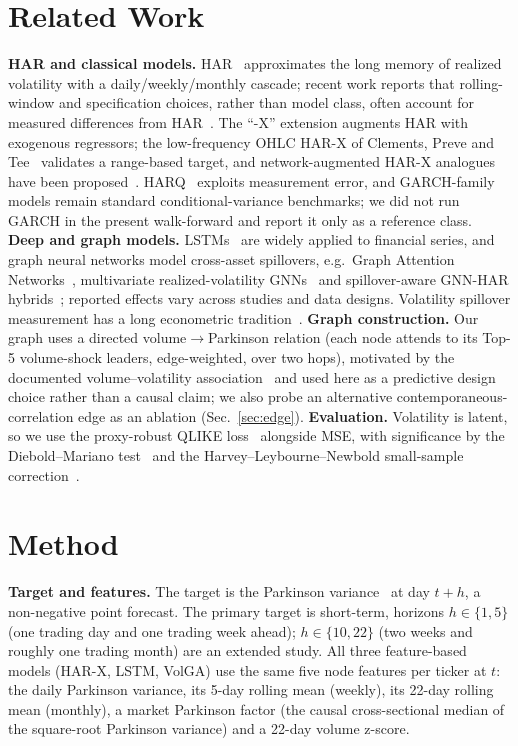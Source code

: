 \documentclass[runningheads]{llncs}
\begin{document}
\section{Related Work}
\textbf{HAR and classical models.} HAR~\cite{corsi2009} approximates the long memory of realized
volatility with a daily/weekly/monthly cascade; recent work reports that rolling-window and
specification choices, rather than model class, often account for measured differences from
HAR~\cite{audrino2025}. The ``-X'' extension augments HAR with exogenous regressors; the low-frequency
OHLC HAR-X of Clements, Preve and Tee~\cite{clements2024} validates a range-based target, and
network-augmented HAR-X analogues have been proposed~\cite{gnarharx2025}. HARQ~\cite{harq2016}
exploits measurement error, and GARCH-family models remain standard conditional-variance benchmarks;
we did not run GARCH in the present walk-forward and report it only as a reference class.
\textbf{Deep and graph models.} LSTMs~\cite{lstm1997} are widely applied to financial series, and
graph neural networks model cross-asset spillovers, e.g.\ Graph Attention Networks~\cite{gat2018},
multivariate realized-volatility GNNs~\cite{chen2022} and spillover-aware GNN-HAR
hybrids~\cite{gnnhar2025}; reported effects vary across studies and data designs. Volatility spillover
measurement has a long econometric tradition~\cite{dy2012}. \textbf{Graph construction.} Our graph
uses a directed volume$\to$Parkinson relation (each node attends to its Top-5 volume-shock leaders,
edge-weighted, over two hops), motivated by the documented volume--volatility
association~\cite{karpoff1987} and used here as a predictive design choice rather than a causal claim;
we also probe an alternative
contemporaneous-correlation edge as an ablation (Sec.~\ref{sec:edge}). \textbf{Evaluation.}
Volatility is latent, so we use the proxy-robust QLIKE loss~\cite{patton2011} alongside MSE, with
significance by the Diebold--Mariano test~\cite{dm1995} and the Harvey--Leybourne--Newbold
small-sample correction~\cite{hln1997}.

\section{Method}
\textbf{Target and features.} The target is the Parkinson variance~\cite{parkinson1980} at day
$t{+}h$, a non-negative point forecast. The primary target is short-term, horizons $h\in\{1,5\}$
(one trading day and one trading week ahead); $h\in\{10,22\}$ (two weeks and roughly one trading
month) are an extended study. All three feature-based models (HAR-X, LSTM, VolGA) use the same five
node features per ticker at $t$: the daily Parkinson variance, its 5-day rolling mean (weekly), its
22-day rolling mean (monthly), a market Parkinson factor (the causal cross-sectional median of the
square-root Parkinson variance) and a 22-day volume z-score.
\end{document}
